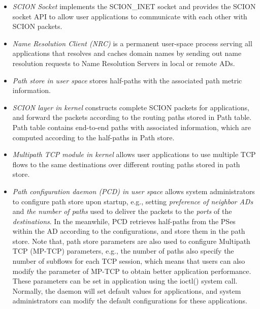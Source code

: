 \begin{itemize}
\item{\em SCION Socket} implements the SCION\_INET socket and provides the SCION socket API to allow user applications to communicate with each other with SCION packets.

\item{\em Name Resolution Client (NRC)} is a permanent user-space process serving all applications that resolves and caches domain names by sending out name resolution requests to Name Resolution Servers in local or remote ADs.

\item{\em Path store in user space} stores half-paths with the associated path metric information. %


\item{\em SCION layer in kernel} constructs complete SCION packets for applications, and forward the packets according to the routing paths stored in Path
table. Path table contains end-to-end paths with associated
information, which are computed according to the half-paths in Path
store.

\item{\em Multipath TCP module in kernel} allows user applications to use multiple TCP flows to the same destinations over different routing paths stored in path store.

\item{\em Path configuration daemon (PCD) in user space} allows system administrators
to configure path store upon startup, e.g., setting {\em preference
of neighbor ADs} and {\em the number of paths} used to deliver the
packets to the {\em ports} of the {\em destinations}. In the
meanwhile, PCD retrieves half-paths from the PSes within the AD
according to the configurations, and store them in the path store.
Note that, path store parameters are also used to configure
Multipath TCP (MP-TCP) parameters, e.g., the number of paths also
specify the number of subflows for each TCP session, which means
that users can also modify the parameter of MP-TCP to obtain better
application performance. These parameters can be set in application
using the ioctl() system call. Normally, the daemon will set default
values for applications, and system administrators can modify the
default configurations for these applications.
\end{itemize}


